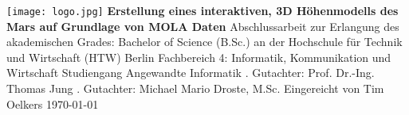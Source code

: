 \begin{titlepage}
\begin{center}
\texttt{[image: logo.jpg]}
\linebreak[4]
\linebreak[4]
\linebreak[4]
\linebreak[4]
\textbf{\Large\color{htwgreen}Erstellung eines interaktiven, 3D Höhenmodells des Mars auf Grundlage von MOLA Daten}
\linebreak[4]
\linebreak[4]
\linebreak[4]
Abschlussarbeit
\linebreak[4]
\linebreak[4]
zur Erlangung des akademischen Grades:
\linebreak[4]
\linebreak[4]
Bachelor of Science (B.Sc.)
\linebreak[4]
\linebreak[4]
an der
\linebreak[4]
\linebreak[4]
Hochschule für Technik und Wirtschaft (HTW) Berlin
\linebreak[4]
Fachbereich 4: Informatik, Kommunikation und Wirtschaft
\linebreak[4]
Studiengang Angewandte Informatik
\linebreak[4]
\linebreak[4]
. Gutachter: Prof. Dr.-Ing. Thomas Jung
. Gutachter: Michael Mario Droste, M.Sc.
\linebreak[4]
\linebreak[4]
\linebreak[4]
\linebreak[4]
\linebreak[4]
Eingereicht von Tim Oelkers
\vfill
\today
\end{center}
\end{titlepage}